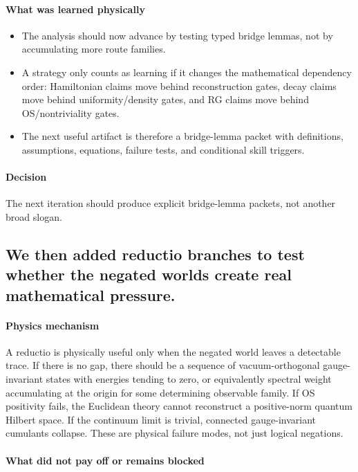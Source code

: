 \documentclass[11pt]{article}
\begin{document}
\paragraph{What was learned physically}

\begin{itemize}
\item The analysis should now advance by testing typed bridge lemmas, not by accumulating more route families.
\item A strategy only counts as learning if it changes the mathematical dependency order: Hamiltonian claims move behind reconstruction gates, decay claims move behind uniformity/density gates, and RG claims move behind OS/nontriviality gates.
\item The next useful artifact is therefore a bridge-lemma packet with definitions, assumptions, equations, failure tests, and conditional skill triggers.
\end{itemize}

\paragraph{Decision}

The next iteration should produce explicit bridge-lemma packets, not another broad slogan.

\subsection*{We then added reductio branches to test whether the negated worlds create real mathematical pressure.}

\paragraph{Physics mechanism}

A reductio is physically useful only when the negated world leaves a detectable trace. If there is no gap, there should be a sequence of vacuum-orthogonal gauge-invariant states with energies tending to zero, or equivalently spectral weight accumulating at the origin for some determining observable family. If OS positivity fails, the Euclidean theory cannot reconstruct a positive-norm quantum Hilbert space. If the continuum limit is trivial, connected gauge-invariant cumulants collapse. These are physical failure modes, not just logical negations.

\paragraph{What did not pay off or remains blocked}
\end{document}
